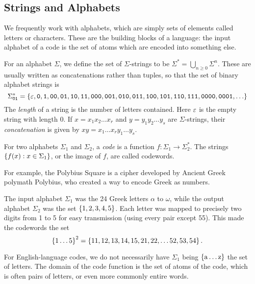 \documentclass{article}
\begin{document}
\subsection{Strings and Alphabets}

We frequently work with alphabets,
which are simply sets of elements called letters or characters.
These are the building blocks of a language:
the input alphabet of a code is the set of atoms
which are encoded into something else.

\begin{definition}
	\label{string-concatenation-length}
	For an alphabet $\Sigma$,
	we define the set of $\Sigma$-strings to be
	$\Sigma^* = \bigcup_{n \geq 0} \Sigma^n$.
	These are usually written as concatenations rather than tuples,
	so that the set of binary alphabet strings is
	\[
	\Sigma_\texttt{01}^* = \set{
	\eps, \texttt{0}, \texttt{1},
	\texttt{00}, \texttt{01}, \texttt{10}, \texttt{11},
	\texttt{000}, \texttt{001}, \texttt{010}, \texttt{011},
	\texttt{100}, \texttt{101}, \texttt{110}, \texttt{111},
	\texttt{0000}, \texttt{0001}, \dots }
	\]
	The \textit{length} of a string
	is the number of letters contained.
	Here $\varepsilon$ is the empty string with length 0.
	If $x = x_1x_2\dots x_r$ and $y = y_1 y_2\dots y_s$ are $\Sigma$-strings,
	their \textit{concatenation} is given by $xy=x_1 \dots x_r y_1 \dots y_s$.
\end{definition}

For two alphabets $\Sigma_1$ and $\Sigma_2$, a \textit{code} is a function $f: \Sigma_1 \to \Sigma_2^*$. The strings $\left\lbrace f(x): x \in \Sigma_1 \right\rbrace$, or the image of $f$, are called codewords.

\begin{example}
	\label{polybius-square-example}
    For example, the Polybius Square
    is a cipher developed by Ancient Greek polymath Polybius,
    who created a way to encode Greek as numbers.
    
    The input alphabet $\Sigma_1$
    was the 24 Greek letters $\alpha$ to $\omega$,
    while the output alphabet $\Sigma_2$
    was the set $\left\lbrace 1, 2, 3, 4, 5 \right\rbrace$.
    Each letter was mapped to precisely two digits from 1 to 5
    for easy transmission (using every pair except 55).
    This made the codewords the set
    \[
	\left\lbrace 1 \dots 5 \right\rbrace^2 =
	\left\lbrace 11, 12, 13, 14, 15, 21, 22, \dots 52, 53, 54 \right\rbrace.
	\]
\end{example}

\begin{note}
	 For English-language codes,
	 we do not necessarily have $\Sigma_1$ being
	 $\left\lbrace \mathrm{a} \dots \mathrm{z} \right\rbrace$
	 the set of letters.
	 The domain of the code function is the set of atoms of the code,
	 which is often pairs of letters, or even more commonly entire words.
\end{note}
\end{document}

